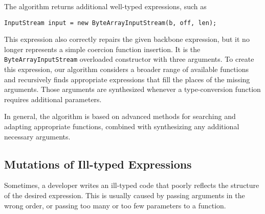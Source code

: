 The algorithm returns additional well-typed expressions, such as 
\begin{lstlisting}    
InputStream input = new ByteArrayInputStream(b, off, len);
\end{lstlisting}
This expression also correctly repairs the given backbone expression, but it no longer represents a simple coercion function insertion. It is the \lstinline{ByteArrayInputStream} overloaded constructor with three arguments. To create this expression, our algorithm considers a broader range of available functions and recursively finds appropriate expressions that fill the places of the missing arguments. Those arguments
are synthesized whenever a type-conversion function requires additional parameters.

In general, the \ourTool algorithm is based on advanced methods for searching and adapting  appropriate functions, combined with synthesizing any additional necessary arguments.


\subsection{Mutations of Ill-typed Expressions}


Sometimes, a developer writes an ill-typed code that poorly reflects the structure of the desired expression. This is usually caused by passing arguments in the wrong order, or passing too many or too few parameters to a function.

